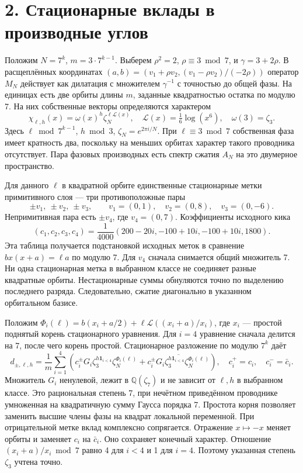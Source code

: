 \documentclass[11pt,a4paper]{article}
\newcommand{\sect}[1]{\section*{\sffamily\color{ink}#1}}
\newcommand{\QQ}{\mathbb Q}
\begin{document}
\newpage
\sect{2. Стационарные вклады в производные углов}
Положим \(N=7^k\), \(m=3\cdot7^{k-1}\). Выберем \(\rho^2=2\), \(\rho\equiv3\bmod7\), и \(\gamma=3+2\rho\). В расщеплённых координатах \((a,b)=(v_1+\rho v_2,(v_1-\rho v_2)/(-2\rho))\) оператор \(M_N\) действует как дилатация с множителем \(\gamma^{-1}\) с точностью до общей фазы. На единицах есть две орбиты длины \(m\), заданные квадратностью остатка по модулю 7. На них собственные векторы определяются характером
\[
         \chi_{\ell,h}(x)=\omega(x)^h\zeta_N^{\ell\mathcal L(x)},
\quad \mathcal L(x)=\tfrac16\log(x^6),\quad \omega(3)=\zeta_3 .
\]
Здесь \(\ell\bmod7^{k-1}\), \(h\bmod3\), \(\zeta_N=e^{2\pi i/N}\). При \(\ell\equiv3\bmod7\) собственная фаза имеет кратность два, поскольку на меньших орбитах характер такого проводника отсутствует. Пара фазовых производных есть спектр сжатия \(A_N\) на это двумерное пространство.

Для данного \(\ell\) в квадратной орбите единственные стационарные метки примитивного слоя --- три противоположные пары
\[
          \pm v_1,\ \pm v_2,\ \pm v_3,\qquad
         v_1=(0,1),\quad v_2=(0,8),\quad v_3=(0,-6).
\]
Непримитивная пара есть \(\pm v_4\), где \(v_4=(0,7)\). Коэффициенты исходного кика
\[
       (c_1,c_2,c_3,c_4)
               =\frac1{4000}(200-20i,-100+10i,-100+10i,1800).
\]
Эта таблица получается подстановкой исходных меток в сравнение \(b x(x+a)=\ell a\) по модулю 7. Для \(v_4\) сначала снимается общий множитель 7. Ни одна стационарная метка в выбранном классе не соединяет разные квадратные орбиты. Нестационарные суммы обнуляются точно по выделению последнего разряда. Следовательно, сжатие диагонально в указанном орбитальном базисе.

Положим \(\Phi_i(\ell)=b(x_i+a/2)+\ell\mathcal L((x_i+a)/x_i)\), где \(x_i\) --- простой поднятый корень стационарного уравнения. Для \(i=4\) уравнение сначала делится на 7, после чего корень простой. Стационарное разложение по модулю \(7^k\) даёт
\[
 d_{\pm,\ell,h}=\frac1m\sum_{i=1}^4
   \left(c_i^\pm G_i\zeta_3^{h\mathbf1_{i<4}}\zeta_N^{\Phi_i(\ell)}
          +\overline{c_i^\pm G_i\zeta_3^{h\mathbf1_{i<4}}
                                     \zeta_N^{\Phi_i(\ell)}}\right),
\quad c_i^+=c_i,\quad c_i^-=\bar c_i .
\]
Множитель \(G_i\) ненулевой, лежит в \(\QQ(\zeta_7)\) и не зависит от \(\ell,h\) в выбранном классе. Это рациональная степень 7, при нечётном приведённом проводнике умноженная на квадратичную сумму Гаусса порядка 7. Простота корня позволяет заменить высшие члены фазы на квадрат локальной переменной. При отрицательной метке вклад комплексно сопрягается. Отражение \(x\mapsto-x\) меняет орбиты и заменяет \(c_i\) на \(\bar c_i\). Оно сохраняет конечный характер. Отношение \((x_i+a)/x_i\bmod7\) равно 4 для \(i<4\) и 1 для \(i=4\). Поэтому указанная степень \(\zeta_3\) учтена точно.
\end{document}
